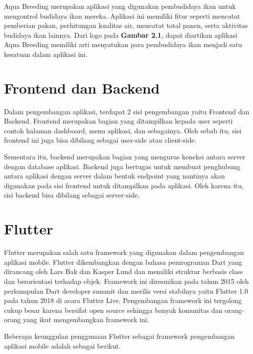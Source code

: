 Aqua Breeding merupakan aplikasi yang digunakan pembudidaya ikan untuk mengontrol budidaya ikan mereka. Aplikasi ini memiliki fitur seperti mencatat pemberian pakan, perhitungan kualitas air, mencatat total panen, serta aktivitas budidaya ikan lainnya. Dari logo pada \textbf{Gambar 2.1}, dapat diartikan aplikasi Aqua Breeding memiliki arti menyatukan para pembudidaya ikan menjadi satu kesatuan dalam aplikasi ini.

\section{Frontend dan Backend}

Dalam pengembangan aplikasi, terdapat 2 sisi pengembangan yaitu Frontend dan Backend. Frontend merupakan bagian yang ditampilkan kepada user seperti contoh halaman dashboard, menu aplikasi, dan sebagainya. Oleh sebab itu, sisi frontend ini juga bisa dibilang sebagai user-side atau client-side.

Sementara itu, backend merupakan bagian yang mengurus koneksi antara server dengan database aplikasi. Backend juga bertugas untuk membuat penghubung antara aplikasi dengan server dalam bentuk endpoint yang nantinya akan digunakan pada sisi frontend untuk ditampilkan pada aplikasi. Oleh karena itu, sisi backend bisa dibilang sebagai server-side.

\section{Flutter}

Flutter merupakan salah satu framework yang digunakan dalam pengembangan aplikasi mobile. Flutter dikembangkan dengan bahasa pemrograman Dart yang dirancang oleh Lars Bak dan Kasper Lund dan memiliki struktur berbasis class dan berorientasi terhadap objek. Framework ini diresmikan pada tahun 2015 oleh perkumpulan Dart developer summit dan merilis versi stabilnya yaitu Flutter 1.0 pada tahun 2018 di acara Flutter Live. Pengembangan framework ini tergolong cukup besar karena bersifat open source sehingga banyak komunitas dan orang-orang yang ikut mengembangkan framework ini.

Beberapa keunggulan penggunaan Flutter sebagai framework pengembangan aplikasi mobile adalah sebagai berikut.

